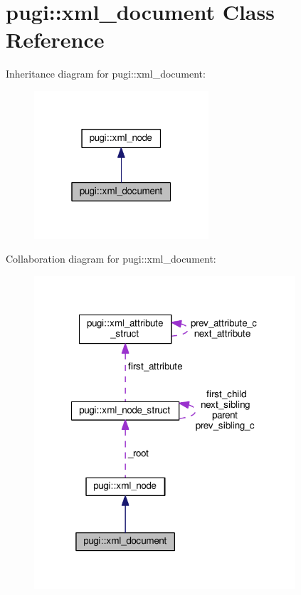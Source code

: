\hypertarget{classpugi_1_1xml__document}{\section{pugi\+:\+:xml\+\_\+document Class Reference}
\label{classpugi_1_1xml__document}
}


Inheritance diagram for pugi\+:\+:xml\+\_\+document\+:
\nopagebreak
\begin{figure}[H]
\begin{center}
\leavevmode
\includegraphics[width=184pt]{classpugi_1_1xml__document__inherit__graph}
\end{center}
\end{figure}


Collaboration diagram for pugi\+:\+:xml\+\_\+document\+:
\nopagebreak
\begin{figure}[H]
\begin{center}
\leavevmode
\includegraphics[width=275pt]{classpugi_1_1xml__document__coll__graph}
\end{center}
\end{figure}
